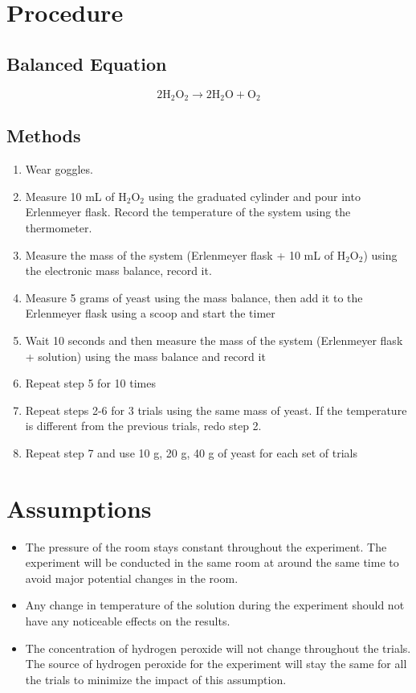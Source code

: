 \documentclass[10pt, letterpaper]{article}
\begin{document}
\section{Procedure}

\subsection{Balanced Equation}
\begin{equation}
2\text{H}_2\text{O}_2 \rightarrow 2\text{H}_2\text{O} + \text{O}_2
\end{equation}

\subsection{Methods}

\begin{enumerate}
\item{Wear goggles.}
\item{Measure 10 mL of H$_2$O$_2$ using the graduated cylinder and pour into Erlenmeyer flask. Record the temperature of the system using the thermometer.}
\item{Measure the mass of the system (Erlenmeyer flask + 10 mL of H$_2$O$_2$) using the electronic mass balance, record it.}
\item{Measure 5 grams of yeast using the mass balance, then add it to the Erlenmeyer flask using a scoop and start the timer}
\item{Wait 10 seconds and then measure the mass of the system (Erlenmeyer flask + solution) using the mass balance and record it}
\item{Repeat step 5 for 10 times}
\item{Repeat steps 2-6 for 3 trials using the same mass of yeast. If the temperature is different from the previous trials, redo step 2.}
\item{Repeat step 7 and use 10 g, 20 g, 40 g of yeast for each set of trials}
\end{enumerate}

\section{Assumptions}
\begin{itemize}
\item{The pressure of the room stays constant throughout the experiment. The experiment will be conducted in the same room at around the same time to avoid major potential changes in the room.}
\item{Any change in temperature of the solution during the experiment should not have any noticeable effects on the results.}
\item{The concentration of hydrogen peroxide will not change throughout the trials. The source of hydrogen peroxide for the experiment will stay the same for all the trials to minimize the impact of this assumption.}
\end{itemize}
\end{document}

